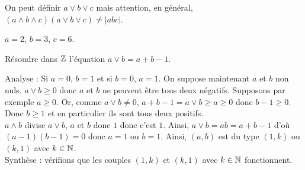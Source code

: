 \documentclass{magnolia}
\begin{document}
\begin{remarqueUnique}
\remarque On peut définir $a\vee b \vee c$ mais attention, en général, $(a\wedge b \wedge c)(a\vee b \vee c)\neq |abc| $.
\end{remarqueUnique}

\begin{sol}
$a=2$, $b=3$, $c=6$.
\end{sol}

\begin{exoUnique}
\exo Résoudre dans $\mathbb{Z}$ l'équation $a\vee b=a+b-1$.
  \begin{sol}
  Analyse : Si $a=0$, $b=1$ et si $b=0$, $a=1$. On suppose maintenant $a$ et $b$ non nuls. $a\vee b\geq 0$ donc $a$ et $b$ ne peuvent être tous deux négatifs. Supposons par exemple $a\geq 0$. Or, comme $a\vee b\neq 0$, $a+b-1=a\vee b\geq a\geq 0$ donc $b-1\geq 0$. Donc $b\geq 1$ et en particulier ils sont tous deux positifs.\\
  $a\wedge b$ divise $a\vee b$, $a$ et $b$ donc $1$ donc c'est $1$. Ainsi, $a\vee b=ab=a+b-1$ d'où $(a-1)(b-1)=0$ donc $a=1$ ou $b=1$. Ainsi, $(a,b)$ est du type $(1,k)$ ou $(k,1)$ avec $k\in\mathbb{N}$.\\
  
  Synthèse : vérifions que les couples $(1,k)$ et $(k,1)$ avec $k\in\mathbb{N}$ fonctionnent.
  \end{sol}
\end{exoUnique}



\end{document}
